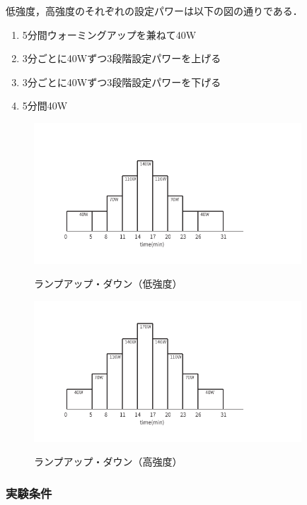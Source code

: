 低強度，高強度のそれぞれの設定パワーは以下の図の通りである．

\begin{enumerate}
  \item 5分間ウォーミングアップを兼ねて40W
  \item 3分ごとに40Wずつ3段階設定パワーを上げる
  \item 3分ごとに40Wずつ3段階設定パワーを下げる
  \item 5分間40W
\end{enumerate}

\begin{figure}[h]
  \begin{center}
    \label{fig:protocol_rampup_light}
    \includegraphics[width=10cm]{fig/protocol_rampup_light.pdf}
    \caption{ランプアップ・ダウン（低強度）}
  \end{center}
\end{figure}

\begin{figure}[h]
  \begin{center}
    \label{fig:protocol_rampup_hard}
    \includegraphics[width=10cm]{fig/protocol_rampup_hard.pdf}
    \caption{ランプアップ・ダウン（高強度）}
  \end{center}
\end{figure}

\subsubsection{実験条件}

